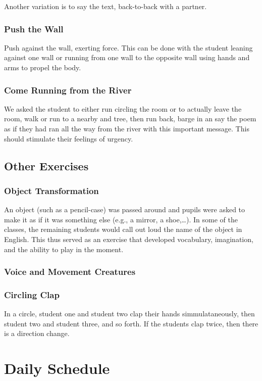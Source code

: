 \documentclass[article,twocolumn,twoside]{memoir}
\begin{document}
Another variation is to say the text, back-to-back with a partner.

\subsection{Push the Wall}

Push against the wall, exerting force. This can be done with the student
leaning against one wall or running from one wall to the opposite wall using
hands and arms to propel the body.

\subsection{Come Running from the River}

We asked the student to either run circling the room or to actually leave the
room, walk or run to a nearby and tree, then run back, barge in an say the poem
as if they had ran all the way from the river with this important message. This
should stimulate their feelings of urgency.

\section{Other Exercises}
\subsection{Object Transformation}
An object (such as a pencil-case) was passed around and pupils were asked to
make it as if it was something else (e.g., a mirror, a shoe,\dots). In some of
the classes, the remaining students would call out loud the name of the object
in English. This thus served as an exercise that developed vocabulary, imagination,
and the ability to play in the moment.

\subsection{Voice and Movement Creatures}
\subsection{Circling Clap}
In a circle, student one and student two clap their hands simmulataneously,
then student two and student three, and so forth. If the students clap twice,
then there is a direction change.

\chapter{Daily Schedule}
\end{document}

